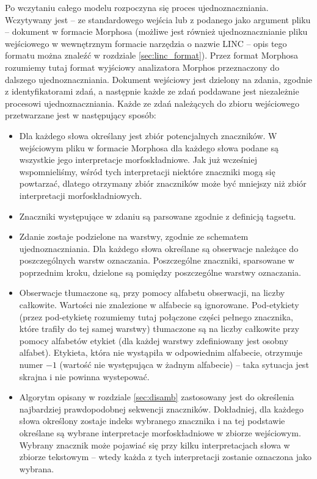 \documentclass[a4paper,10]{article}
\newcommand{\comment}[2]{\noindent{{\scriptsize\sffamily(\marginpar{\sffamily #1}#2)}}}
\newcommand{\jw}[1]{\comment{\tiny{JW}}{\textcolor{blue}{#1}}}
\begin{document}
Po wczytaniu całego modelu rozpoczyna się proces ujednoznaczniania.
Wczytywany jest -- ze standardowego wejścia lub z podanego jako argument
pliku -- dokument w formacie Morphosa (możliwe jest również
ujednoznacznianie pliku wejściowego w wewnętrznym formacie narzędzia
o nazwie LINC -- opis tego formatu można znaleźć w rozdziale
\ref{sec:linc_format}).
Przez format Morphosa rozumiemy tutaj format wyjściowy analizatora Morphos
przeznaczony do dalszego ujednoznaczniania.
Dokument wejściowy jest dzielony na zdania, zgodnie z identyfikatorami zdań,
a następnie każde ze zdań poddawane jest niezależnie procesowi
ujednoznaczniania.
Każde ze zdań należących do zbioru wejściowego przetwarzane jest w następujący sposób:
\begin{itemize}
\item Dla każdego słowa określany jest zbiór potencjalnych znaczników.
  W wejściowym pliku w formacie Morphosa dla każdego słowa podane są
  wszystkie jego interpretacje morfoskładniowe. Jak już wcześniej
  wspomnieliśmy, wśród tych interpretacji niektóre znaczniki mogą
  się powtarzać, dlatego otrzymany zbiór znaczników może być mniejszy
  niż zbiór interpretacji morfoskładniowych.
\item Znaczniki występujące w zdaniu są parsowane zgodnie
  z definicją tagsetu.
\item Zdanie zostaje podzielone na warstwy, zgodnie ze schematem ujednoznaczniania.
  Dla każdego słowa określane są obserwacje należące do poszczególnych
  warstw oznaczania.
  Poszczególne znaczniki, sparsowane w poprzednim kroku, dzielone są pomiędzy
  poszczególne warstwy oznaczania.
\item Obserwacje tłumaczone są, przy pomocy alfabetu obserwacji, na liczby całkowite.
  Wartości nie znalezione w alfabecie są ignorowane.
  Pod-etykiety (przez pod-etykietę rozumiemy tutaj połączone części pełnego znacznika,
  które trafiły do tej samej warstwy) tłumaczone są na
  liczby całkowite przy pomocy alfabetów etykiet (dla każdej warstwy zdefiniowany
  jest osobny alfabet).
  Etykieta, która nie wystąpiła w odpowiednim alfabecie, otrzymuje numer
  $-1$ (wartość nie występująca w żadnym alfabecie) -- taka sytuacja jest skrajna
  i nie powinna wystepować.
\item Algorytm opisany w rozdziale \ref{sec:disamb} zastosowany jest do
  określenia najbardziej prawdopodobnej sekwencji znaczników. Dokładniej,
  dla każdego słowa określony zostaje indeks wybranego znacznika i na tej
  podstawie określane są wybrane interpretacje morfoskładniowe w zbiorze
  wejściowym. Wybrany znacznik może pojawiać się
  przy kilku interpretacjach słowa w zbiorze tekstowym -- wtedy każda
  z tych interpretacji zostanie oznaczona jako wybrana.
\end{itemize}
\end{document}
